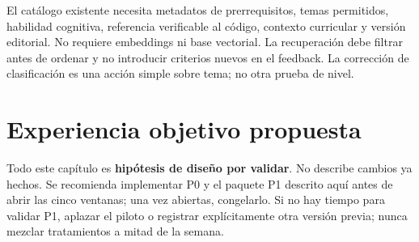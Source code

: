 \documentclass[11pt,a4paper]{report}
\begin{document}
El catálogo existente necesita metadatos de prerrequisitos, temas permitidos, habilidad cognitiva, referencia verificable al código, contexto curricular y versión editorial. No requiere embeddings ni base vectorial. La recuperación debe filtrar antes de ordenar y no introducir criterios nuevos en el feedback. La corrección de clasificación es una acción simple sobre tema; no otra prueba de nivel.

\chapter{Experiencia objetivo propuesta}
\label{ch:experiencia}
Todo este capítulo es \textbf{hipótesis de diseño por validar}. No describe cambios ya hechos. Se recomienda implementar P0 y el paquete P1 descrito aquí antes de abrir las cinco ventanas; una vez abiertas, congelarlo. Si no hay tiempo para validar P1, aplazar el piloto o registrar explícitamente otra versión previa; nunca mezclar tratamientos a mitad de la semana.
\end{document}
